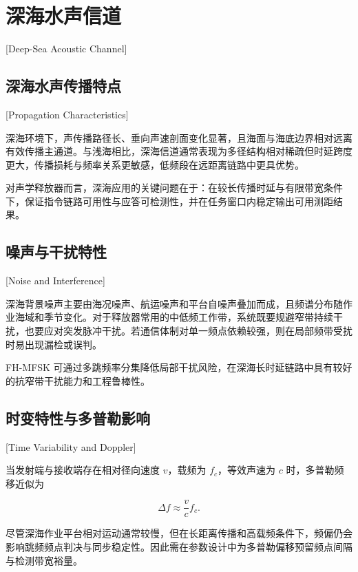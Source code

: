 
\chapter{深海水声信道}[Deep-Sea Acoustic Channel]
\label{chap02}

\section{深海水声传播特点}[Propagation Characteristics]

深海环境下，声传播路径长、垂向声速剖面变化显著，且海面与海底边界相对远离有效传播主通道。与浅海相比，深海信道通常表现为多径结构相对稀疏但时延跨度更大，传播损耗与频率关系更敏感，低频段在远距离链路中更具优势\cite{hovemRayTraceModeling2013,nosalMeasuredModeledHighfrequency2010}。

对声学释放器而言，深海应用的关键问题在于：在较长传播时延与有限带宽条件下，保证指令链路可用性与应答可检测性，并在任务窗口内稳定输出可用测距结果。

\section{噪声与干扰特性}[Noise and Interference]

深海背景噪声主要由海况噪声、航运噪声和平台自噪声叠加而成，且频谱分布随作业海域和季节变化。对于释放器常用的中低频工作带，系统既要规避窄带持续干扰，也要应对突发脉冲干扰。若通信体制对单一频点依赖较强，则在局部频带受扰时易出现漏检或误判\cite{freitagAnalysisChannelEffects2001}。

FH-MFSK 可通过多跳频率分集降低局部干扰风险，在深海长时延链路中具有较好的抗窄带干扰能力和工程鲁棒性。

\section{时变特性与多普勒影响}[Time Variability and Doppler]

当发射端与接收端存在相对径向速度 $v$，载频为 $f_c$，等效声速为 $c$ 时，多普勒频移近似为

\begin{equation}
  \Delta f \approx \frac{v}{c}f_c.
  \label{eq:doppler}
\end{equation}

尽管深海作业平台相对运动通常较慢，但在长距离传播和高载频条件下，频偏仍会影响跳频频点判决与同步稳定性。因此需在参数设计中为多普勒偏移预留频点间隔与检测带宽裕量。

